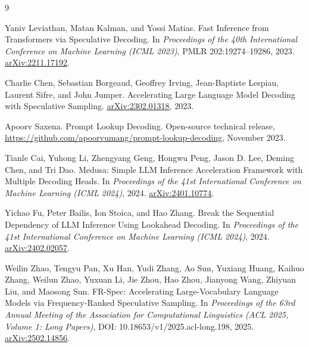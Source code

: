 \documentclass[11pt,a4paper]{article}
\begin{document}
\begin{thebibliography}{9}

Yaniv Leviathan, Matan Kalman, and Yossi Matias.
\newblock Fast Inference from Transformers via Speculative Decoding.
\newblock In \emph{Proceedings of the 40th International Conference on Machine Learning (ICML 2023)}, PMLR 202:19274--19286, 2023. \href{https://arxiv.org/abs/2211.17192}{arXiv:2211.17192}.

Charlie Chen, Sebastian Borgeaud, Geoffrey Irving, Jean-Baptiste Lespiau, Laurent Sifre, and John Jumper.
\newblock Accelerating Large Language Model Decoding with Speculative Sampling.
\newblock \href{https://arxiv.org/abs/2302.01318}{arXiv:2302.01318}, 2023.

Apoorv Saxena.
\newblock Prompt Lookup Decoding.
\newblock Open-source technical release, \url{https://github.com/apoorvumang/prompt-lookup-decoding}, November 2023.

Tianle Cai, Yuhong Li, Zhengyang Geng, Hongwu Peng, Jason D. Lee, Deming Chen, and Tri Dao.
\newblock Medusa: Simple LLM Inference Acceleration Framework with Multiple Decoding Heads.
\newblock In \emph{Proceedings of the 41st International Conference on Machine Learning (ICML 2024)}, 2024. \href{https://arxiv.org/abs/2401.10774}{arXiv:2401.10774}.

Yichao Fu, Peter Bailis, Ion Stoica, and Hao Zhang.
\newblock Break the Sequential Dependency of LLM Inference Using Lookahead Decoding.
\newblock In \emph{Proceedings of the 41st International Conference on Machine Learning (ICML 2024)}, 2024. \href{https://arxiv.org/abs/2402.02057}{arXiv:2402.02057}.

Weilin Zhao, Tengyu Pan, Xu Han, Yudi Zhang, Ao Sun, Yuxiang Huang, Kaihuo Zhang, Weilun Zhao, Yuxuan Li, Jie Zhou, Hao Zhou, Jianyong Wang, Zhiyuan Liu, and Maosong Sun.
\newblock FR-Spec: Accelerating Large-Vocabulary Language Models via Frequency-Ranked Speculative Sampling.
\newblock In \emph{Proceedings of the 63rd Annual Meeting of the Association for Computational Linguistics (ACL 2025, Volume 1: Long Papers)}, DOI: 10.18653/v1/2025.acl-long.198, 2025. \href{https://arxiv.org/abs/2502.14856}{arXiv:2502.14856}.

\end{thebibliography}
\end{document}
